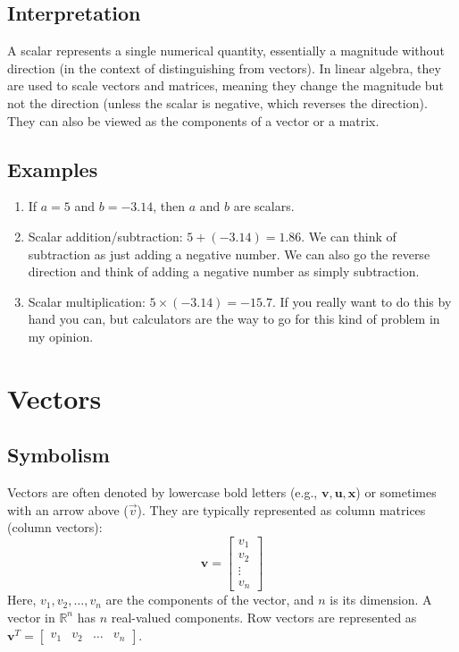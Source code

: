\documentclass{article}
\newcommand{\vect}[1]{\bm{#1}} %
\newcommand{\R}{\mathbb{R}}    %
\begin{document}
\subsection*{Interpretation}
A scalar represents a single numerical quantity, essentially a magnitude without direction (in the context of distinguishing from vectors). In linear algebra, they are used to scale vectors and matrices, meaning they change the magnitude but not the direction (unless the scalar is negative, which reverses the direction). They can also be viewed as the components of a vector or a matrix.

\subsection*{Examples}
\begin{enumerate}
    \item If $a = 5$ and $b = -3.14$, then $a$ and $b$ are scalars.
    \item Scalar addition/subtraction: $5 + (-3.14) = 1.86$. We can think of subtraction as just adding a negative number. We can also go the reverse direction and think of adding a negative number as simply subtraction.
    \item Scalar multiplication: $5 \times (-3.14) = -15.7$. If you really want to do this by hand you can, but calculators are the way to go for this kind of problem in my opinion.
\end{enumerate}

\section{Vectors}

\subsection*{Symbolism}
Vectors are often denoted by lowercase bold letters (e.g., $\vect{v}, \vect{u}, \vect{x}$) or sometimes with an arrow above ($\vec{v}$). They are typically represented as column matrices (column vectors):
\[ \vect{v} = \begin{bmatrix} v_1 \\ v_2 \\ \vdots \\ v_n \end{bmatrix} \]
Here, $v_1, v_2, \dots, v_n$ are the components of the vector, and $n$ is its dimension. A vector in $\R^n$ has $n$ real-valued components. Row vectors are represented as $\vect{v}^T = \begin{bmatrix} v_1 & v_2 & \dots & v_n \end{bmatrix}$.
\end{document}
